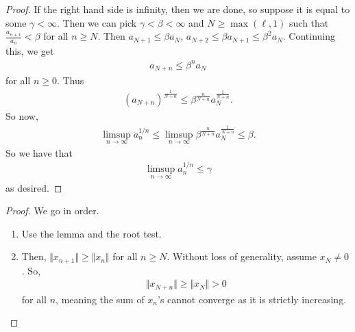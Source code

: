 \documentclass{report}
\begin{document}
\begin{proof}
    If the right hand side is infinity, then we are done, so suppose it is equal to some $\gamma < \infty$. Then we can pick $\gamma < \beta < \infty$ and $N \geq \max(\ell, 1)$ such that $\frac{a_{n+1}}{a_n} < \beta$ for all $n \geq N$. Then $a_{N+1} \leq \beta a_N$, $a_{N+2} \leq \beta a_{N+1} \leq \beta^2 a_{N}$. Continuing this, we get 
    \begin{align*}
        a_{N+n} \leq \beta^n a_N
    \end{align*}
    for all $n \geq 0$. Thus 
    \begin{align*}
        (a_{N+n})^{\frac{1}{N+n}} \leq \beta^{\frac{n}{N+n}} a_N^{\frac{1}{N+n}}.
    \end{align*}
    So now,
    \begin{align*}
        \limsup_{n\to\infty} a_n^{1/n} \leq \limsup_{n\to\infty} \beta^{\frac{n}{N+n}} a_N^{\frac{1}{N+n}} \leq \beta.
    \end{align*}
    So we have that 
    \begin{align*}
        \limsup_{n\to\infty} a_n^{1/n} \leq \gamma
    \end{align*}
    as desired.
\end{proof}

\begin{proof}
    We go in order.
    \begin{enumerate}
        \item Use the lemma and the root test.
        \item Then, $\Vert x_{n+1}\Vert \geq \Vert x_n\Vert$ for all $n \geq N$. Without loss of generality, assume $x_N \neq 0$. So,
        \begin{align*}
            \Vert x_{N+n} \Vert \geq \Vert x_N\Vert > 0
        \end{align*}
        for all $n$, meaning the sum of $x_n$'s cannot converge as it is strictly increasing.
    \end{enumerate}
\end{proof}
\newpage
\end{document}
